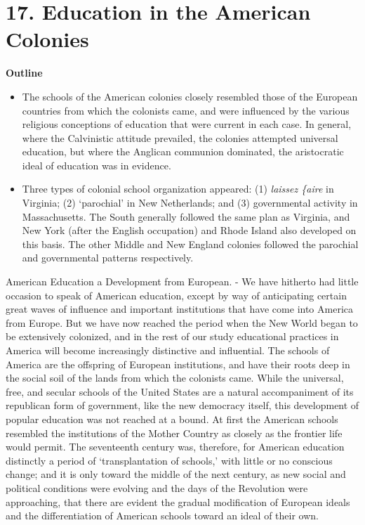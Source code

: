 \documentclass[
]{book}
\providecommand{\tightlist}{%
  \setlength{\itemsep}{0pt}\setlength{\parskip}{0pt}}
\begin{document}
\hypertarget{education-in-the-american-colonies}{%
\chapter{17. Education in the American Colonies}\label{education-in-the-american-colonies}}

\textbf{Outline}

\begin{itemize}
\tightlist
\item
  The schools of the American colonies closely resembled those of the European countries from which the colonists came, and were influenced by the various religious conceptions of education that were current in each case. In general, where the Calvinistic attitude prevailed, the colonies attempted universal education, but where the Anglican communion dominated, the aristocratic ideal of education was in evidence.
\item
  Three types of colonial school organization appeared: (1) \emph{laissez \{aire} in Virginia; (2) `parochial' in New Netherlands; and (3) governmental activity in Massachusetts. The South generally followed the same plan as Virginia, and New York (after the English occupation) and Rhode Island also developed on this basis. The other Middle and New England colonies followed the parochial and governmental patterns respectively.
\end{itemize}

American Education a Development from European. - We have hitherto had little occasion to speak of American education, except by way of anticipating certain great waves of influence and important institutions that have come into America from Europe. But we have now reached the period when the New World began to be extensively colonized, and in the rest of our study educational practices in America will become increasingly distinctive and influential. The schools of America are the offspring of European institutions, and have their roots deep in the social soil of the lands from which the colonists came. While the universal, free, and secular schools of the United States are a natural accompaniment of its republican form of government, like the new democracy itself, this development of popular education was not reached at a bound. At first the American schools resembled the institutions of the Mother Country as closely as the frontier life would permit. The seventeenth century was, therefore, for American education distinctly a period of `transplantation of schools,' with little or no conscious change; and it is only toward the middle of the next century, as new social and political conditions were evolving and the days of the Revolution were approaching, that there are evident the gradual modification of European ideals and the differentiation of American schools toward an ideal of their own.
\end{document}
